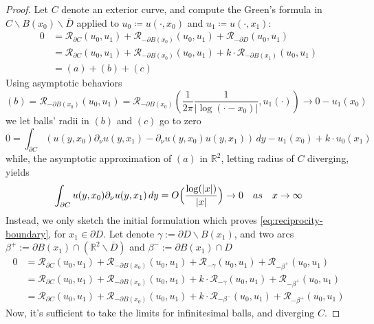 \documentclass[10pt, a4paper, twoside, openright]{book}
\theoremstyle{definition}
\theoremstyle{plain}
\theoremstyle{plain}
\theoremstyle{plain}
\theoremstyle{plain}
\theoremstyle{plain}
\theoremstyle{plain}
\theoremstyle{plain}
\theoremstyle{plain}
\begin{document}
\begin{proof}
 Let $C$ denote an exterior curve, and compute the Green's formula in $C \backslash B(x_0) \backslash \overline{D}$ applied to $u_0\coloneqq u(\cdot,x_0)$ and $u_1\coloneqq u(\cdot,x_1)$:
 \begin{align*}
 0 &= \mathcal{R}_{\partial C}(u_0,u_1)+\mathcal{R}_{-\partial B(x_0)}(u_0,u_1)+\mathcal{R}_{-\partial D}(u_0,u_1) \\
   &= \mathcal{R}_{\partial C}(u_0,u_1)+\mathcal{R}_{-\partial B(x_0)}(u_0,u_1) + k \cdot \mathcal{R}_{-\partial B(x_1)}(u_0,u_1)\\
   &= (a) + (b) + (c)
 \end{align*}
 Using asymptotic behaviors
 \begin{equation*}
  (b) = \mathcal{R}_{-\partial B(x_0)}(u_0,u_1) = \mathcal{R}_{-\partial B(x_0)}(\frac{1}{2\pi}\frac{1}{| \log(\cdot - x_0) |},u_1(\cdot))\to 0 - u_1(x_0)
 \end{equation*}
 we let balls' radii in $(b)$ and $(c)$ go to zero
 \begin{equation*}
 0 = \int_{\partial C}(u(y,x_0)\partial_\nu u(y,x_1) - \partial_\nu u(y,x_0)u(y,x_1))\, dy - u_1(x_0) + k \cdot u_0(x_1)
 \end{equation*}
 while, the asymptotic approximation of $(a)$ in $\mathbb{R}^2$, letting radius of $C$ diverging, yields
 \begin{equation*}
  \int_{\partial C} u(y,x_0)\partial_\nu u(y,x_1) \, dy = O\Bigl(\frac{\log(|x|)}{|x|}\Bigr)\to 0\quad as \quad x\to \infty
 \end{equation*}
 Instead, we only sketch the initial formulation  which proves \ref{eq:reciprocity-boundary}, for $x_1\in\partial D$. Let denote  
 $\gamma := \partial D\backslash B(x_1)$, and two arcs $\beta^+ := \partial B(x_1) \cap (\mathbb{R}^2\backslash\overline{D})$ and $\beta^- := \partial B(x_1) \cap D$
 \begin{align*}
 0 &= \mathcal{R}_{\partial C}(u_0,u_1)+\mathcal{R}_{-\partial B(x_0)}(u_0,u_1)+\mathcal{R}_{- \gamma}(u_0,u_1)+\mathcal{R}_{- \beta^+}(u_0,u_1)\\
 &= \mathcal{R}_{\partial C}(u_0,u_1)+\mathcal{R}_{-\partial B(x_0)}(u_0,u_1)+k\cdot \mathcal{R}_{- \gamma}(u_0,u_1)+\mathcal{R}_{- \beta^+}(u_0,u_1)\\
 &= \mathcal{R}_{\partial C}(u_0,u_1)+\mathcal{R}_{-\partial B(x_0)}(u_0,u_1)+k\cdot \mathcal{R}_{- \beta^-}(u_0,u_1)+\mathcal{R}_{- \beta^+}(u_0,u_1)
 \end{align*}
 Now, it's sufficient to take the limits for infinitesimal balls, and diverging $C$.
\end{proof}
\end{document}

